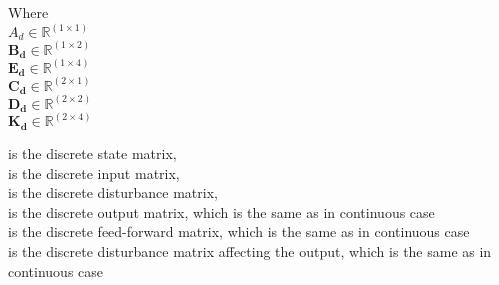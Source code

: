 \begin{minipage}[t]{0.20\textwidth}
Where\\
\hspace*{8mm} $A_d \in \mathbb{R}^{(1 \times 1)}$ \\
\hspace*{8mm} $\pmb{B_d} \in \pmb{\mathbb{R}}^{(1 \times 2)}$ \\
\hspace*{8mm} $\pmb{E_d} \in \pmb{\mathbb{R}}^{(1 \times 4)}$ \\
\hspace*{8mm} $\pmb{C_d} \in \pmb{\mathbb{R}}^{(2 \times 1)}$ \\
\newline
\hspace*{8mm} $\pmb{D_d} \in \pmb{\mathbb{R}}^{(2 \times 2)}$ \\
\newline
\hspace*{8mm} $\pmb{K_d} \in \pmb{\mathbb{R}}^{(2 \times 4)}$ 
\end{minipage}
\begin{minipage}[t]{0.68\textwidth}
\vspace*{2mm}
is the discrete state matrix, \\
is the discrete input matrix, \\
is the discrete disturbance matrix, \\ 
is the discrete output matrix, which is the same as in continuous case \\
is the discrete feed-forward matrix, which is the same as in continuous case \\
is the discrete disturbance matrix affecting the output, which is the same as in continuous case \\
\end{minipage}

